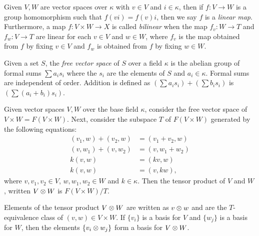 \begin{definition}\label{def:linear_map_of_vector_spaces}
  Given $V, W$ are vector spaces over $\kappa$ with $v \in V$ and $i \in \kappa$, then
  if $f:V \to W$ is a group homomorphism such that $f(v i) = f(v) i$, then we say $f$ is a
  \emph{linear map}. Furthermore, a map $f:V\times W \to X$ is called \emph{bilinear} when the
  map $f_v:W\to T$ and $f_w:V\to T$ are linear for each $v\in V$ and $w\in W$, where $f_v$ is the
  map obtained from $f$ by fixing $v\in V$ and $f_w$ is obtained from $f$ by fixing  $w\in W$.
\end{definition}

\begin{definition}\label{def:free_vector_space}
  Given a set $S$, the \emph{free vector space} of $S$ over a field $\kappa$ is the abelian group
  of formal sums $\sum a_i s_i$ where the $s_i$ are the elements of $S$ and $a_i \in \kappa$.
  Formal sums are independent of order. Addition is defined as $(\sum a_i s_i) + (\sum b_i s_i)$ is
  $(\sum (a_i + b_i) s_i)$.
\end{definition}

\begin{definition}\label{def:tensor_product_of_vector_spaces}
  Given vector spaces $V, W$ over the base field $\kappa$, consider the free vector space of $V
  \times W = F(V\times W)$. Next, consider the subspace $T$ of $F(V\times W)$ generated by the
  following equations:
  \begin{align*}
    (v_1,w)+(v_2,w) & = (v_1+v_2,w)\\
    (v,w_1)+(v,w_2) & = (v, w_1+w_2)\\
    k(v,w) &= (k v,w)\\
    k(v,w) &= (v,k w),
  \end{align*}
  where $v,v_1,v_2 \in V$, $w,w_1,w_2 \in W$ and $k\in \kappa$. Then the tensor product of
  $V$ and $W$, written $V\otimes W$ is $F(V\times W)/T$.
\end{definition}

Elements of the tensor product $V\otimes W$ are written as $v\otimes w$ and are the $T$-equivalence class of
$(v,w) \in V\times W$. If $\{v_i\}$ is a basis for $V$ and $\{w_j\}$ is a basis for $W$, then the
elements $\{v_i\otimes w_j\}$ form a basis for $V\otimes W$.




